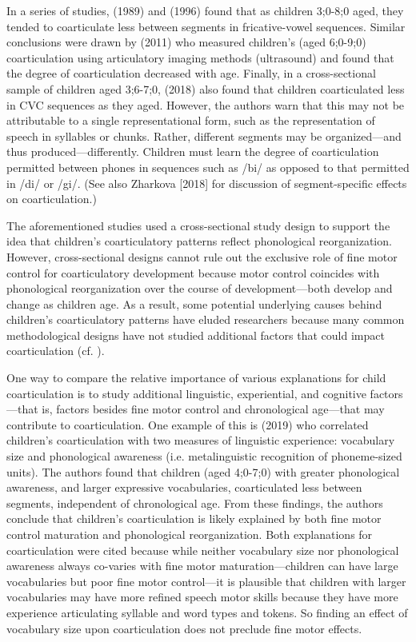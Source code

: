 \documentclass[a4paper,man,natbib,donotrepeattitle, apacite]{apa6}
\begin{document}
In a series of studies, \citeauthor{nittrouerEmergencePhoneticSegments1989} (1989) and \citeauthor{nittrouerHowChildrenLearn1996} (1996) found that as children 3;0-8;0 aged, they tended to coarticulate less between segments in fricative-vowel sequences. Similar conclusions were drawn by \citeauthor{zharkovaCoarticulationIndicatorSpeech2011} (2011) who measured children’s (aged 6;0-9;0) coarticulation using articulatory imaging methods (ultrasound) and found that the degree of coarticulation decreased with age. Finally, in a cross-sectional sample of children aged 3;6-7;0, \citeauthor{noirayHowChildrenOrganize2018} (2018) also found that children coarticulated less in CVC sequences as they aged. However, the authors warn that this may not be attributable to a single representational form, such as the representation of speech in syllables or chunks. Rather, different segments may be organized---and thus produced---differently. Children must learn the degree of coarticulation permitted between phones in sequences such as /bi/ as opposed to that permitted in /di/ or /gi/. (See also Zharkova [2018] for discussion of segment-specific effects on coarticulation.) 

The aforementioned studies used a cross-sectional study design to support the idea that children’s coarticulatory patterns reflect phonological reorganization. However, cross-sectional designs cannot rule out the exclusive role of fine motor control for coarticulatory development because motor control coincides with phonological reorganization over the course of development---both develop and change as children age. As a result, some potential underlying causes behind children’s coarticulatory patterns have eluded researchers because many common methodological designs have not studied additional factors that could impact coarticulation (cf. ).

One way to compare the relative importance of various explanations for child coarticulation is to study additional linguistic, experiential, and cognitive factors---that is, factors besides fine motor control and chronological age---that may contribute to coarticulation. One example of this is \citeauthor{noiraySpokenLanguageDevelopment2019} (2019) who correlated children’s coarticulation with two measures of linguistic experience: vocabulary size and phonological awareness (i.e. metalinguistic recognition of phoneme-sized units). The authors found that children (aged 4;0-7;0) with greater phonological awareness, and larger expressive vocabularies, coarticulated less between segments, independent of chronological age. From these findings, the authors conclude that children’s coarticulation is likely explained by both fine motor control maturation and phonological reorganization. Both explanations for coarticulation were cited because while neither vocabulary size nor phonological awareness always co-varies with fine motor maturation---children can have large vocabularies but poor fine motor control---it is plausible that children with larger vocabularies may have more refined speech motor skills because they have more experience articulating syllable and word types and tokens. So finding an effect of vocabulary size upon coarticulation does not preclude fine motor effects. 
\end{document}

